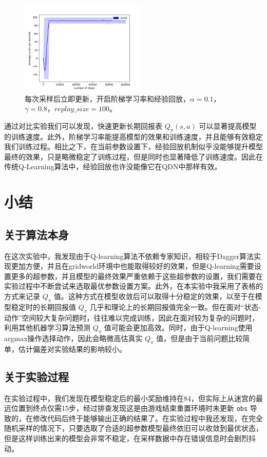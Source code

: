 \documentclass[a4paper,12pt]{article}
\begin{document}
\begin{CJK}{UTF8}{gbsn}
\begin{figure}[htbp]
	\begin{minipage}[t]{0.45\textwidth}
		\centering
		\includegraphics[width=6cm]{code/performance_bs=1.png}
		\caption{\tiny 每次采样后立即更新，开启阶梯学习率和经验回放，$\alpha=0.1$，$\gamma=0.8$，$replay\_size=100$。}
	\end{minipage}
\end{figure}


通过对比实验我们可以发现，快速更新长期回报表 $Q_\pi(s,a)$ 可以显著提高模型的训练速度。此外，阶梯学习率能提高模型的效果和训练速度，并且能够有效稳定我们训练过程。相比之下，在当前参数设置下，经验回放机制似乎没能够提升模型最终的效果，只是略微稳定了训练过程，但是同时也显著降低了训练速度。因此在传统Q-Learning算法中，经验回放也许没能像它在QDN中那样有效。
\section{小结}
\subsection{关于算法本身}
在这次实验中，我发现由于Q-learning算法不依赖专家知识，相较于Dagger算法实现更加方便，并且在gridworld环境中也能取得较好的效果，但是Q-learning需要设置更多的超参数，并且模型的最终效果严重依赖于这些超参数的设置，我们需要在实验过程中不断尝试来选取最优参数设置方案。此外，在本实验中我采用了表格的方式来记录 $Q_\pi$ 值。这种方式在模型收敛后可以取得十分稳定的效果，以至于在模型稳定时的长期回报值 $Q_\pi$ 几乎和理论上的长期回报值完全一致。但在面对“状态-动作”空间较大复杂问题时，往往难以完成训练，因此在面对较为复杂的问题时，利用其他机器学习算法预测 $Q_\pi$ 值可能会更加高效。同时，由于Q-learning使用argmax操作选择动作，因此会略微高估真实 $Q_\pi$ 值，但是由于当前问题比较简单，估计偏差对实验结果的影响较小。
\subsection{关于实验过程}
在实验过程中，我们发现在模型稳定后的最小奖励维持在84，但实际上从迷宫的最远位置到终点仅需15步，经过排查发现这是由游戏结束重置环境时未更新 \texttt{obs} 导致的，在修改代码后终于能够输出正确的结果了。在实验过程中我还发现，在完全随机采样的情况下，只要选取了合适的超参数模型最终依旧可以收敛到最优状态，但是这样训练出来的模型会非常不稳定，在采样数据中存在错误信息时会剧烈抖动。
\end{CJK}
\end{document}
